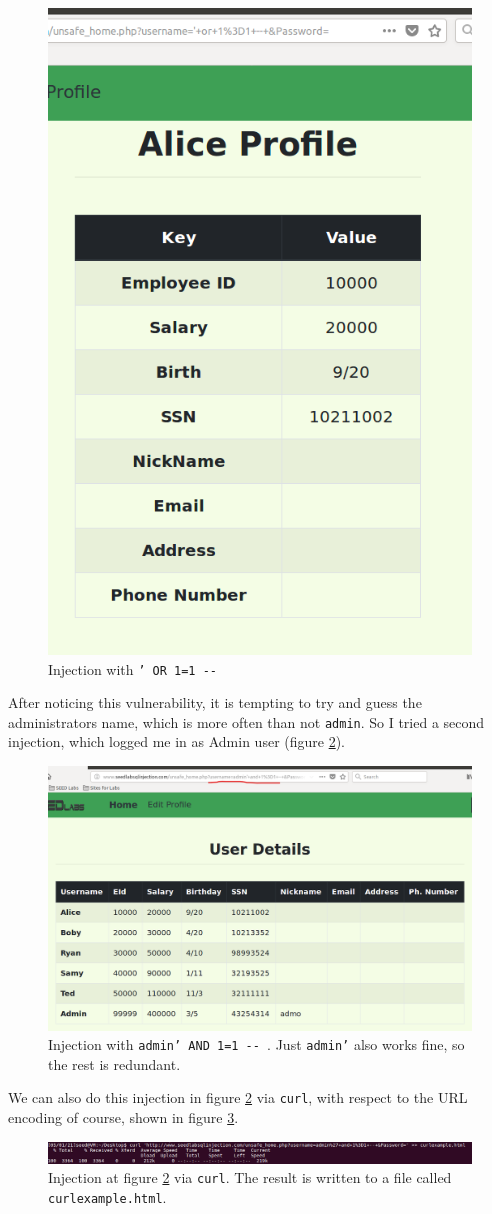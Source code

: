 \documentclass[12pt,reqno]{amsart}
\newcommand{\code}[1]{\texttt{#1}}
\begin{document}
\begin{figure}[h]
\includegraphics[width=0.35\linewidth]{screenshots/SQL_ALICE_INJECT.png}
\caption{Injection with \code{' OR 1=1 -{}- }}
\label{fig:2}
\end{figure}

After noticing this vulnerability, it is tempting to try and guess the administrators name, which is more often than not \code{admin}. So I tried a second injection, which logged me in as Admin user (figure \ref{fig:3}).

\begin{figure}[h]
\includegraphics[width=0.7\linewidth]{screenshots/SQL_ADMIN_INJECT.png}
\caption{Injection with \code{admin'  AND 1=1 -{}- }. Just \code{admin'} also works fine, so the rest is redundant.}
\label{fig:3}
\end{figure}

We can also do this injection in figure \ref{fig:3} via \code{curl}, with respect to the URL encoding of course, shown in figure \ref{fig:4}.

\begin{figure}[h]
\includegraphics[width=\linewidth]{screenshots/CURL_EXAMPLE_CMD.png}
\caption{Injection at figure \ref{fig:3} via \code{curl}. The result is written to a file called \code{curlexample.html}.}
\label{fig:4}
\end{figure}
\end{document}
